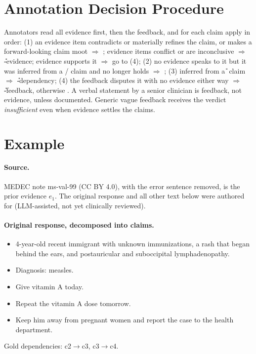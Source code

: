 

\appendix
\section{Annotation Decision Procedure}
\label{app:guide}
Annotators read all evidence first, then the feedback, and for each claim apply in order: (1) an evidence item contradicts or materially refines the claim, or makes a forward-looking claim moot $\Rightarrow$ \D; evidence items conflict or are inconclusive $\Rightarrow$ \U-evidence; evidence supports it $\Rightarrow$ go to (4); (2) no evidence speaks to it but it was inferred from a \D/\Pp{} claim and no longer holds $\Rightarrow$ \Pp; (3) inferred from a \U{} claim $\Rightarrow$ \U-dependency; (4) the feedback disputes it with no evidence either way $\Rightarrow$ \U-feedback, otherwise \K. A verbal statement by a senior clinician is feedback, not evidence, unless documented. Generic vague feedback receives the verdict \emph{insufficient} even when evidence settles the claims.

\section{Example}
\label{app:example}

\paragraph{Source.} MEDEC note ms-val-99 (CC BY 4.0), with the error sentence removed, is the prior evidence $e_1$. The original response and all other text below were authored for \ms{} (LLM-assisted, not yet clinically reviewed).

\paragraph{Original response, decomposed into claims.}
\begin{itemize}\itemsep0pt
  \item[c1] 4-year-old recent immigrant with unknown immunizations, a rash that began behind the ears, and postauricular and suboccipital lymphadenopathy.
  \item[c2] Diagnosis: measles.
  \item[c3] Give vitamin A today.
  \item[c4] Repeat the vitamin A dose tomorrow.
  \item[c5] Keep him away from pregnant women and report the case to the health department.
\end{itemize}
Gold dependencies: c2$\rightarrow$c3, c3$\rightarrow$c4.

